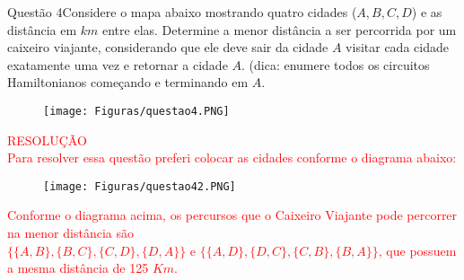 \documentclass[12pt]{article}
\begin{document}
\newpage
\begin{section}{Questão 4}{Considere o mapa abaixo mostrando quatro cidades ($A,B,C,D$) e as distância em $km$ entre elas. Determine
a menor distância a ser percorrida por um caixeiro viajante, considerando que ele deve sair da cidade $A$ visitar cada cidade exatamente uma vez e retornar a cidade $A$. (dica: enumere todos os circuitos
Hamiltonianos começando e terminando em $A$.}

\begin{figure}[H]
    \centering
    \texttt{[image: Figuras/questao4.PNG]}
\end{figure}

\textcolor{red}{RESOLUÇÃO}\\

\textcolor{red}{Para resolver essa questão preferi colocar as cidades conforme o diagrama abaixo:}


\begin{figure}[H]
    \centering
    \texttt{[image: Figuras/questao42.PNG]}
\end{figure}

\noindent \textcolor{red}{Conforme o diagrama acima, os percursos que o Caixeiro Viajante pode percorrer na menor distância são $\{\{A,B\},\{B,C\},\{C,D\},\{D,A\}\} \text{ e } \{\{A,D\},\{D,C\},\{C,B\},\{B,A\}\}$, que possuem a mesma distância de 125 $Km$.}

\end{section}
\newpage
\end{document}
